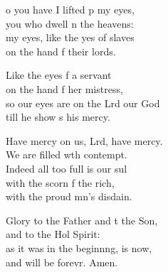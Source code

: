 \settowidth{\versewidth}{so our eyes are on the Lord our God *}
\begin{psalmverse}%
  \begin{patverse}
o you have I lifted p my eyes,\Med\\
you who dwell \pointup{\i}n the heavens:\\
my eyes, like the yes of slaves\Med\\
on the hand f their lords.

Like the eyes f a servant\Med\\
on the hand f her mistress,\\
so our eyes are on the Lrd our God\Med\\
till he show s his mercy.

Have mercy on us, Lrd, have mercy.\Med\\
We are filled w\pointup{\i}th contempt.\\
Indeed all too full is our sul\Flex\\
with the scorn f the rich,\Med\\
with the proud mn’s disdain.

Glory to the Father and t the Son,\Med\\
and to the Hol Spirit:\\
as it was in the beginn\pointup{\i}ng, is now,\Med\\
and will be forevr. Amen. 
  \end{patverse}
\end{psalmverse}
